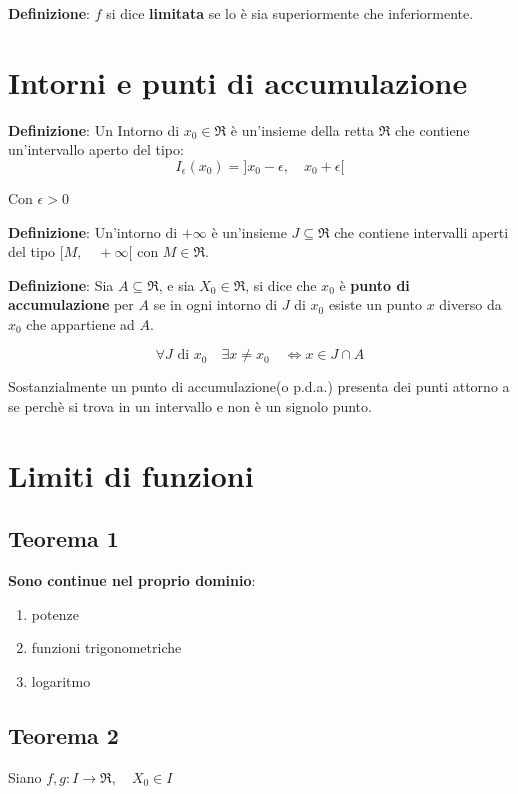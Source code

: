 \textbf{Definizione}:
$f$ si dice \textbf{limitata} se lo è sia superiormente che inferiormente.

\section{Intorni e punti di accumulazione}

\textbf{Definizione}:
Un Intorno di $x_0 \in \Re$ è un'insieme della retta $\Re$ che contiene un'intervallo aperto del tipo:
\begin{equation*}
    I_\epsilon (x_0) = ] x_0 - \epsilon, \quad x_0 + \epsilon [
\end{equation*}

Con $\epsilon > 0$

\textbf{Definizione}:
Un'intorno di $+\infty$ è un'insieme $J \subseteq \Re$ che contiene intervalli aperti
del tipo $[M, \quad +\infty[$ con $M \in \Re$.

\textbf{Definizione}:
Sia $A \subseteq \Re$, e sia $X_0 \in \Re$, si dice che $x_0$ è \textbf{punto di accumulazione}
per $A$ se in ogni intorno di $J$ di $x_0$ esiste un punto $x$ diverso da $x_0$
che appartiene ad $A$.

\begin{equation*}
    \forall J \text{ di } x_0 \quad \exists x \neq x_0 \quad \Leftrightarrow x \in J \cap A
\end{equation*}

Sostanzialmente un punto di accumulazione(o p.d.a.) presenta dei punti attorno a se perchè si trova in un intervallo e non è un signolo punto.

\section{Limiti di funzioni}
\subsection{Teorema 1}
\textbf{Sono continue nel proprio dominio}:
\begin{enumerate}
    \item potenze
    \item funzioni trigonometriche
    \item logaritmo
\end{enumerate}
\subsection{Teorema 2}
Siano $f,g : I \rightarrow \Re, \quad X_0 \in I$

